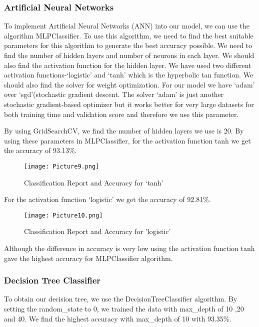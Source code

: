 \documentclass[11pt,conference]{IEEEtran}
\begin{document}
\subsubsection{Artificial Neural Networks}
To implement Artificial Neural Networks (ANN) into our model, we can use the algorithm MLPClassifier. To use this algorithm, we need to find the best suitable parameters for this algorithm to generate the best accuracy possible. We need to find the number of hidden layers and number of neurons in each layer. We should also find the activation function for the hidden layer. We have used two different activation functions-‘logistic’ and ‘tanh’ which is the hyperbolic tan function. We should also find the solver for weight optimization. For our model we have ‘adam’ over ‘sgd’(stochastic gradient descent. The solver ‘adam’ is just another stochastic gradient-based optimizer but it works better for very large datasets for both training time and validation score and therefore we use this parameter. \par
By using GridSearchCV, we find the number of hidden layers we use is 20. By using these parameters in MLPClassifier, for the activation function tanh we get the accuracy of 93.13\%.

\begin{figure}[htbp]
\centerline{\texttt{[image: Picture9.png]}}
\caption{Classification Report and Accuracy for ‘tanh’}
\label{fig}
\end{figure}

For the activation function ‘logistic’ we get the accuracy of 92.81\%.

\begin{figure}[htbp]
\centerline{\texttt{[image: Picture10.png]}}
\caption{Classification Report and Accuracy for 'logistic'}
\label{fig}
\end{figure}

Although the difference in accuracy is very low using the activation function tanh gave the highest accuracy for MLPClassifier algorithm.\\

\subsubsection{Decision Tree Classifier}
To obtain our decision tree, we use the DecisionTreeClassifier algorithm. By setting the random\_state to 0, we trained the data with max\_depth of 10 ,20 and 40. We find the highest accuracy with max\_depth of 10 with 93.35\%.
\end{document}
